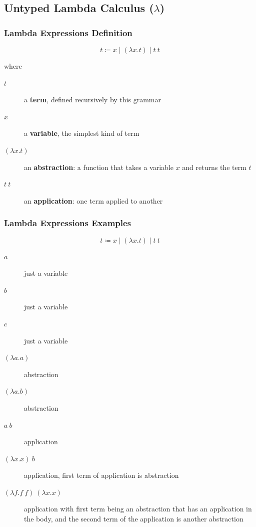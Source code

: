 \documentclass{beamer}
\begin{document}
\subsection{Untyped Lambda Calculus ($\lambda$)}

\begin{frame}[fragile]
  \frametitle{Lambda Expressions Definition}

  $$ t \coloneqq x  \mid  (\lambda x . t)  \mid   t\  t $$

  where
  \begin{description}
    \item[$t$] a \textbf{term}, defined recursively by this grammar
    \item[$x$] a \textbf{variable}, the simplest kind of term
    \item[$(\lambda x . t)$] an \textbf{abstraction}: a function
      that takes a variable $x$ and returns the term $t$
    \item[$t\ t$] an \textbf{application}: one term applied to another
  \end{description}
\end{frame}

\begin{frame}[fragile]
  \frametitle{Lambda Expressions Examples}

  $$ t \coloneqq x  \mid  (\lambda x . t)  \mid   t\  t $$

  \begin{description}
    \item[$a$] just a variable
    \item[$b$] just a variable
    \item[$c$] just a variable
    \item[$(\lambda a . a)$] abstraction
    \item[$(\lambda a . b)$] abstraction
    \item[$a\ b$] application
    \item[$(\lambda x . x)\ b$] application, first term of application is abstraction
    \item[$(\lambda f . f\ f)\ (\lambda x . x)$] application with first term being an abstraction that has an application in the body, and the second term of the application is another abstraction
  \end{description}
\end{frame}
\end{document}
